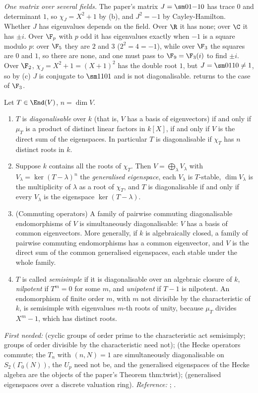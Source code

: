 \emph{One matrix over several fields.} The paper's matrix $J=\sm01{-1}0$ has trace $0$ and
determinant $1$, so $\chi_J=X^2+1$ by (b), and $J^2=-1$ by Cayley-Hamilton. Whether $J$ has
eigenvalues depends on the field. Over $\R$ it has none; over $\C$ it has $\pm i$. Over $\F_p$ with
$p$ odd it has eigenvalues exactly when $-1$ is a square modulo $p$: over $\F_5$ they are $2$ and $3$
($2^2=4=-1$), while over $\F_3$ the squares are $0$ and $1$, so there are none, and one must pass to
$\F_9=\F_3(i)$ to find $\pm i$. Over $\F_2$, $\chi_J=X^2+1=(X+1)^2$ has the double root $1$, but
$J=\sm0110\ne1$, so by (c) $J$ is conjugate to $\sm1101$ and is not
diagonalisable.  returns to the case of $\F_3$.

\begin{theorem}\label{thm:prereq:diag}
Let $T\in\End(V)$, $n=\dim V$.
\begin{enumerate}[label=(\alph*)]
\item $T$ is \emph{diagonalisable} over $k$ (that is, $V$ has a basis of eigenvectors) if and only
if $\mu_T$ is a product of distinct linear factors in $k[X]$, if and only if $V$ is the direct sum
of the eigenspaces. In particular $T$ is diagonalisable if $\chi_T$ has $n$ distinct roots in $k$.
\item Suppose $k$ contains all the roots of $\chi_T$. Then $V=\bigoplus_\lambda V_\lambda$ with
$V_\lambda=\ker(T-\lambda)^n$ the \emph{generalised eigenspace}, each $V_\lambda$ is $T$-stable,
$\dim V_\lambda$ is the multiplicity of $\lambda$ as a root of $\chi_T$, and $T$ is diagonalisable
if and only if every $V_\lambda$ is the eigenspace $\ker(T-\lambda)$.
\item (Commuting operators) A family of pairwise commuting diagonalisable endomorphisms of $V$ is
simultaneously diagonalisable: $V$ has a basis of common eigenvectors. More generally, if $k$ is
algebraically closed, a family of pairwise commuting endomorphisms has a common eigenvector, and $V$
is the direct sum of the common generalised eigenspaces, each stable under the whole family.
\item $T$ is called \emph{semisimple} if it is diagonalisable over an algebraic closure of $k$,
\emph{nilpotent} if $T^m=0$ for some $m$, and \emph{unipotent} if $T-1$ is nilpotent. An
endomorphism of finite order $m$, with $m$ not divisible by the characteristic of $k$, is
semisimple with eigenvalues $m$-th roots of unity, because $\mu_T$ divides $X^m-1$, which has
distinct roots.
\end{enumerate}
\end{theorem}
\noindent\emph{First needed:}  (cyclic groups of order prime to the characteristic act
semisimply; groups of order divisible by the characteristic need not);  (the Hecke
operators commute; the $T_n$ with $(n,N)=1$ are simultaneously diagonalisable on $S_2(\Gamma_0(N))$,
the $U_p$ need not be, and the generalised eigenspaces of the Hecke algebra are the objects of the
paper's Theorem thm:twist);  (generalised eigenspaces over a discrete valuation
ring). \emph{Reference:} \cite[Chapters 5 and 8]{Axler15}; \cite[Chapter XIV]{Lang}.

